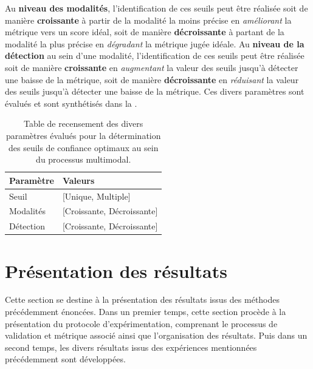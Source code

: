 Au \textbf{niveau des modalités}, l'identification de ces seuils peut être réalisée soit de manière \textbf{croissante} à partir de la modalité la moins précise en \textit{améliorant} la métrique vers un score idéal, soit de manière \textbf{décroissante} à partant de la modalité la plus précise en \textit{dégradant} la métrique jugée idéale. Au \textbf{niveau de la détection} au sein d'une modalité, l'identification de ces seuils peut être réalisée soit de manière \textbf{croissante} en \textit{augmentant} la valeur des seuils jusqu'à détecter une baisse de la métrique, soit de manière \textbf{décroissante} en \textit{réduisant} la valeur des seuils jusqu'à détecter une baisse de la métrique. Ces divers paramètres sont évalués et sont synthétisés dans la .\par

\begin{table}[H]
    \centering
    \begin{tabular}{ll}
        \toprule 
        Paramètre                   & Valeurs                   \\ \midrule
        Seuil                       & [Unique, Multiple]        \\ \midrule
        Modalités                   & [Croissante, Décroissante]\\ \midrule
        Détection                   & [Croissante, Décroissante]\\ \bottomrule
    \end{tabular}
    \caption{Table de recensement des divers paramètres évalués pour la détermination des seuils de confiance optimaux au sein du processus multimodal.}
    \label{tab:multimodal_confidence_model_values}
\end{table}
 
\clearpage

\section{Présentation des résultats}
Cette section se destine à la présentation des résultats issus des méthodes précédemment énoncées. Dans un premier temps, cette section procède à la présentation du protocole d'expérimentation, comprenant le processus de validation et métrique associé ainsi que l'organisation des résultats. Puis dans un second temps, les divers résultats issus des expériences mentionnées précédemment sont développées.\par

